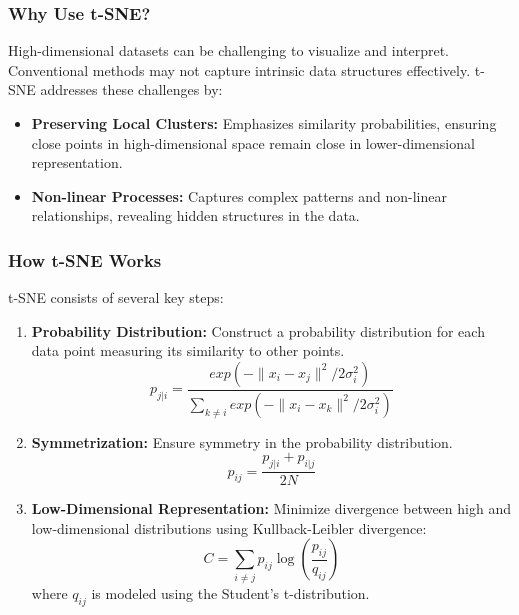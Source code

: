 \documentclass[aspectratio=169]{beamer}
\begin{document}
\begin{frame}[fragile]
    \frametitle{Why Use t-SNE?}
    High-dimensional datasets can be challenging to visualize and interpret. Conventional methods may not capture intrinsic data structures effectively. t-SNE addresses these challenges by:

    \begin{itemize}
        \item \textbf{Preserving Local Clusters:} Emphasizes similarity probabilities, ensuring close points in high-dimensional space remain close in lower-dimensional representation.
        \item \textbf{Non-linear Processes:} Captures complex patterns and non-linear relationships, revealing hidden structures in the data.
    \end{itemize}
\end{frame}

\begin{frame}[fragile]
    \frametitle{How t-SNE Works}
    t-SNE consists of several key steps:

    \begin{enumerate}
        \item \textbf{Probability Distribution:} Construct a probability distribution for each data point measuring its similarity to other points.
        \begin{equation}
            p_{j|i} = \frac{exp(-\|x_i - x_j\|^2 / 2\sigma_i^2)}{\sum_{k \neq i} exp(-\|x_i - x_k\|^2 / 2\sigma_i^2)}
        \end{equation}
        
        \item \textbf{Symmetrization:} Ensure symmetry in the probability distribution.
        \begin{equation}
            p_{ij} = \frac{p_{j|i} + p_{i|j}}{2N}
        \end{equation}

        \item \textbf{Low-Dimensional Representation:} Minimize divergence between high and low-dimensional distributions using Kullback-Leibler divergence:
        \begin{equation}
            C = \sum_{i \neq j} p_{ij} \log \left( \frac{p_{ij}}{q_{ij}} \right)
        \end{equation}
        where \( q_{ij} \) is modeled using the Student's t-distribution.
    \end{enumerate}
\end{frame}
\end{document}
